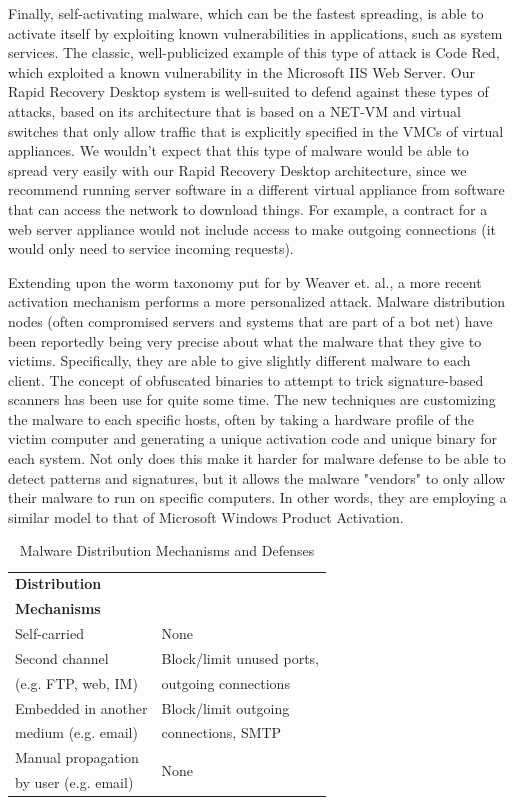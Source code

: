 Finally, self-activating malware, which can be the fastest spreading, is able to activate itself by exploiting known vulnerabilities in applications, such as system services. The classic, well-publicized example of this type of attack is Code Red, which exploited a known vulnerability in the Microsoft IIS Web Server. Our Rapid Recovery Desktop system is well-suited to defend against these types of attacks, based on its architecture that is based on a NET-VM and virtual switches that only allow traffic that is explicitly specified in the VMCs of virtual appliances. We wouldn't expect that this type of malware would be able to spread very easily with our Rapid Recovery Desktop architecture, since we recommend running server software in a different virtual appliance from software that can access the network to download things. For example, a contract for a web server appliance would not include access to make outgoing connections (it would only need to service incoming requests).

Extending upon the worm taxonomy put for by Weaver et. al.\cite{worm_taxonomy_2003}, a more recent activation mechanism performs a more personalized attack. Malware distribution nodes (often compromised servers and systems that are part of a bot net) have been reportedly being very precise about what the malware that they give to victims. Specifically, they are able to give slightly different malware to each client. The concept of obfuscated binaries to attempt to trick signature-based scanners has been use for quite some time. The new techniques are customizing the malware to each specific hosts, often by taking a hardware profile of the victim computer and generating a unique activation code and unique binary for each system. Not only does this make it harder for malware defense to be able to detect patterns and signatures, but it allows the malware "vendors" to only allow their malware to run on specific computers. In other words, they are employing a similar model to that of Microsoft Windows Product Activation.

\begin{table}
\caption{Malware Distribution Mechanisms and Defenses}
\begin{center}
\begin{tabular}{|l|l|}
\hline
\bf Distribution & \bf \multirow{2}{*}{Defenses} \\
\bf Mechanisms & \\ \hline
Self-carried & None \\ \hline
Second channel & Block/limit unused ports, \\
(e.g. FTP, web, IM) & outgoing connections \\ \hline
Embedded in another & Block/limit outgoing \\
medium (e.g. email) & connections, SMTP \\ \hline
Manual propagation & \multirow{2}{*}{None} \\
by user (e.g. email) & \\ \hline
\end{tabular}
\end{center}
\end{table}

